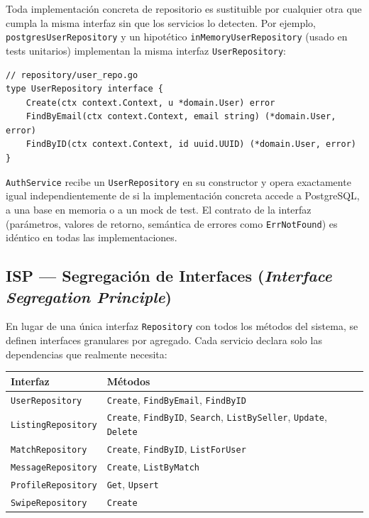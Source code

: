 \documentclass[12pt,a4paper]{article}
\begin{document}
Toda implementación concreta de repositorio es sustituible por cualquier otra que cumpla la misma
interfaz sin que los servicios lo detecten. Por ejemplo, \texttt{postgresUserRepository} y un
hipotético \texttt{inMemoryUserRepository} (usado en tests unitarios) implementan la misma
interfaz \texttt{UserRepository}:

\begin{lstlisting}[style=gostyle]
// repository/user_repo.go
type UserRepository interface {
    Create(ctx context.Context, u *domain.User) error
    FindByEmail(ctx context.Context, email string) (*domain.User, error)
    FindByID(ctx context.Context, id uuid.UUID) (*domain.User, error)
}
\end{lstlisting}

\texttt{AuthService} recibe un \texttt{UserRepository} en su constructor y opera exactamente
igual independientemente de si la implementación concreta accede a PostgreSQL, a una base
en memoria o a un mock de test. El contrato de la interfaz (parámetros, valores de retorno,
semántica de errores como \texttt{ErrNotFound}) es idéntico en todas las implementaciones.
\subsection{ISP --- Segregación de Interfaces (\textit{Interface Segregation Principle})}

En lugar de una única interfaz \texttt{Repository} con todos los métodos del sistema, se definen
interfaces granulares por agregado. Cada servicio declara solo las dependencias que realmente
necesita:

\begin{center}
\begin{tabular}{lp{7.5cm}}
  \toprule
  \textbf{Interfaz} & \textbf{Métodos} \\
  \midrule
  \texttt{UserRepository}    & \texttt{Create}, \texttt{FindByEmail}, \texttt{FindByID} \\
  \texttt{ListingRepository} & \texttt{Create}, \texttt{FindByID}, \texttt{Search},
                               \texttt{ListBySeller}, \texttt{Update}, \texttt{Delete} \\
  \texttt{MatchRepository}   & \texttt{Create}, \texttt{FindByID}, \texttt{ListForUser} \\
  \texttt{MessageRepository} & \texttt{Create}, \texttt{ListByMatch} \\
  \texttt{ProfileRepository} & \texttt{Get}, \texttt{Upsert} \\
  \texttt{SwipeRepository}   & \texttt{Create} \\
  \bottomrule
\end{tabular}
\end{center}
\end{document}

